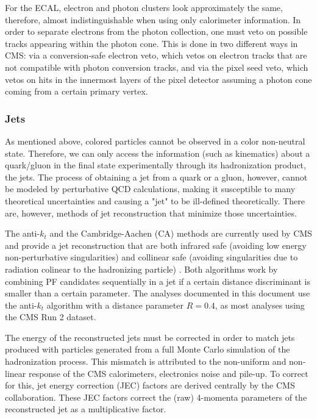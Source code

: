 For the ECAL, electron and photon clusters look approximately the same, therefore, almost indistinguishable when using only calorimeter information. 
In order to separate electrons from the photon collection, one must veto on possible tracks appearing within the photon cone. 
This is done in two different ways in CMS: via a conversion-safe electron veto, which vetos on electron tracks that are not compatible with photon conversion tracks, and via the pixel seed veto, which vetos on hits in the innermost layers of the pixel detector assuming a photon cone coming from a certain primary vertex.

\subsubsection{Jets}

As mentioned above, colored particles cannot be observed in a color non-neutral state. 
Therefore, we can only access the information (such as kinematics) about a quark/gluon in the final state experimentally through its hadronization product, the jets. 
The process of obtaining a jet from a quark or a gluon, however, cannot be modeled by perturbative QCD calculations, making it susceptible to many theoretical uncertainties and causing a "jet" to be ill-defined theoretically. 
There are, however, methods of jet reconstruction that minimize those uncertainties. 

The anti-$k_t$ and the Cambridge-Aachen (CA) methods are currently used by CMS and provide a jet reconstruction that are both infrared safe (avoiding low energy non-perturbative singularities) and collinear safe (avoiding singularities due to radiation colinear to the hadronizing particle) \cite{cms_jet}. 
Both algorithms work by combining PF candidates sequentially in a jet if a certain distance discriminant is smaller than a certain parameter. 
The analyses documented in this document use the anti-$k_t$ algorithm with a distance parameter $R=0.4$, as most analyses using the CMS Run 2 dataset.

The energy of the reconstructed jets must be corrected in order to match jets produced with particles generated from a full Monte Carlo simulation of the hadronization process. 
This mismatch is attributed to the non-uniform and non-linear response of the CMS calorimeters, electronics noise and pile-up. 
To correct for this, jet energy correction (JEC) factors are derived centrally by the CMS collaboration. 
These JEC factors correct the (raw) 4-momenta parameters of the reconstructed jet as a multiplicative factor.

